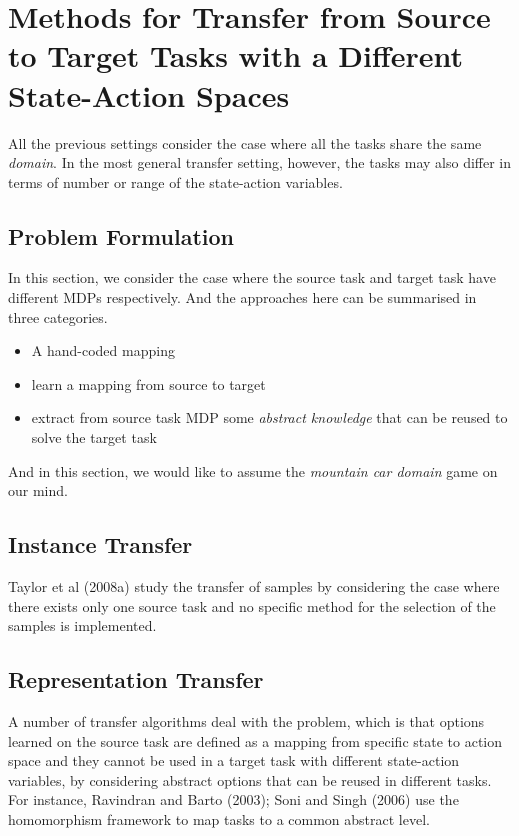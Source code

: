 \documentclass{article}
\begin{document}
\section{Methods for Transfer from Source to Target Tasks with a Different State-Action Spaces}
All the previous settings consider the case where all the tasks share the same \textit{domain}. In the most general transfer setting, however, the tasks may also differ in terms of number or range of the state-action variables.

\subsection{Problem Formulation}
In this section, we consider the case where the source task and target task have different MDPs respectively. And the approaches here can be summarised in three categories.

\begin{itemize}
    \item A hand-coded mapping
    \item learn a mapping from source to target
    \item extract from source task MDP some \textit{abstract knowledge} that can be reused to solve the target task
\end{itemize} And in this section, we would like to assume the \textit{mountain car domain} game on our mind.

\subsection{Instance Transfer}
Taylor et al (2008a) study the transfer of samples by considering the case where there exists only one source task and no specific method for the selection of the samples is implemented.
 
\subsection{Representation Transfer}
A number of transfer algorithms deal with the problem, which is that options learned on the source task are defined as a mapping from specific state to action space and they cannot be used in a target task with different state-action variables, by considering abstract options that can be reused in different tasks. For instance, Ravindran and Barto (2003); Soni and Singh (2006) use the homomorphism framework to map tasks to a common abstract level.
 
\end{document}
